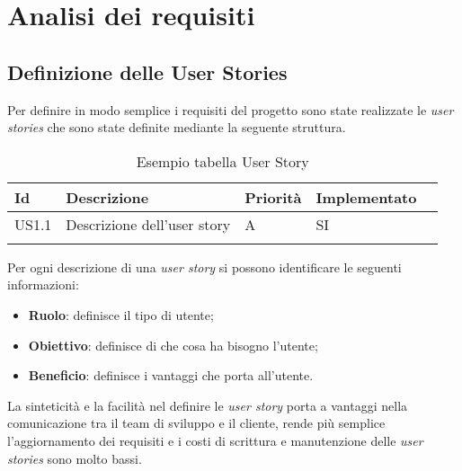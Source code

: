 
\chapter{Analisi dei requisiti}
\label{cap:analisi-requisiti}
\section{Definizione delle User Stories}
Per definire in modo semplice i requisiti del progetto sono state realizzate le \emph{user stories} che sono state definite mediante la seguente struttura.
\begin{longtable} {
		|>{}p{10mm}| 
		|>{}p{70mm}|
		|>{}p{15mm}|
		|>{}p{25mm}|
		>{}p{0mm}}
	\hline
	\textbf{Id} & \textbf{Descrizione} & \textbf{Priorità} & \textbf{Implementato} \\ \hline
	US1.1 & Descrizione dell'user story & A & SI \\ \hline
	\hline
	\caption{Esempio tabella User Story}
\end{longtable}
\noindent
Per ogni descrizione di una \emph{user story} si possono identificare le seguenti informazioni:
\begin{itemize}
	\item \textbf{Ruolo}: definisce il tipo di utente;
	\item \textbf{Obiettivo}: definisce di che cosa ha bisogno l'utente;
	\item \textbf{Beneficio}: definisce i vantaggi che porta all'utente.
\end{itemize} 
\noindent
La sinteticità e la facilità nel definire le \emph{user story} porta a vantaggi nella comunicazione tra il team di sviluppo e il cliente, rende più semplice l'aggiornamento dei requisiti e i costi di scrittura e manutenzione delle \emph{user stories} sono molto bassi.

